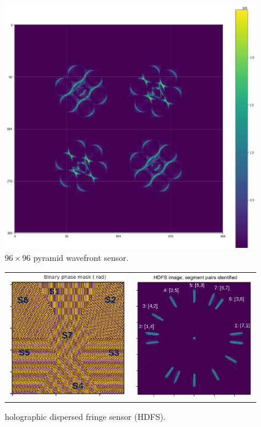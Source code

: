 \documentclass[]{AO4ELT}  %
\begin{document}
\begin{figure}
   \centering
   \includegraphics[trim=1cm 2cm 5cm 2cm,clip,width=0.6\linewidth]{pyramid.png}
   \caption{$96\times 96$ pyramid wavefront sensor.}
   \label{fig:13}
\end{figure}

\begin{figure}
   \centering
   \begin{tabular}{cc}
      \includegraphics[width=0.4\linewidth]{hdfs_mask.png} &
      \includegraphics[width=0.4\linewidth]{hdfs_image.png}
   \end{tabular}
   \caption{holographic dispersed fringe sensor (HDFS).}
   \label{fig:14}
\end{figure}
\end{document}
